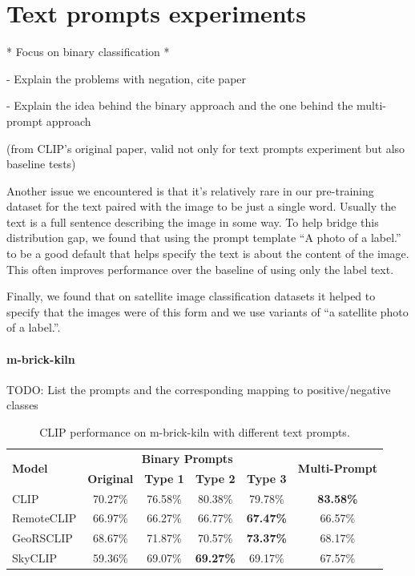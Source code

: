 \documentclass[a4paper, oneside, english]{sapthesis}
\begin{document}
\section{Text prompts experiments}

* Focus on binary classification *

- Explain the problems with negation, cite paper \cite{quantmeyer2024and}

- Explain the idea behind the binary approach and the one behind the multi-prompt approach

(from CLIP's original paper, valid not only for text prompts experiment but also baseline tests)

Another issue we encountered is that it’s relatively rare in our pre-training dataset for the text paired with the image to be just a single word. Usually the text is a full sentence describing the image in some way. To help bridge this distribution gap, we found that using the prompt template “A photo of a {label}.” to be a good default that helps specify the text is about the content of the image. This often improves performance over the baseline of using only the label text.

Finally, we found that on satellite image classification datasets it helped to specify that the images were of this form and we use variants of “a satellite photo of a {label}.”.


\paragraph{m-brick-kiln}

TODO: List the prompts and the corresponding mapping to positive/negative classes


\begin{table}[ht]
\centering
\footnotesize
\renewcommand{\arraystretch}{1.2}
    \begin{tabular}{lc|cccc}
    \toprule
    \multirow{2}{*}{\textbf{Model}} & \multicolumn{4}{c}{\textbf{Binary Prompts}} &  \multirow{2}{*}{\textbf{Multi-Prompt}}\\
    \cmidrule(lr){2-5}
    & \textbf{Original} & \textbf{Type 1} & \textbf{Type 2} & \textbf{Type 3} \\
    \midrule
    CLIP & 70.27\% & 76.58\% & 80.38\% & 79.78\% & \textbf{83.58\%} \\
    RemoteCLIP & 66.97\% & 66.27\% & 66.77\% & \textbf{67.47\%} & 66.57\% \\
    GeoRSCLIP & 68.67\% & 71.87\% & 70.57\% & \textbf{73.37\%} & 68.17\%\\
    SkyCLIP & 59.36\% & 69.07\% & \textbf{69.27\%} & 69.17\% & 67.57\% \\ 
    \bottomrule
    \end{tabular}
\vspace{0.3cm}
\caption{\normalsize CLIP performance on m-brick-kiln with different text prompts.}
\label{tab:prompts1}
\end{table}
\end{document}
